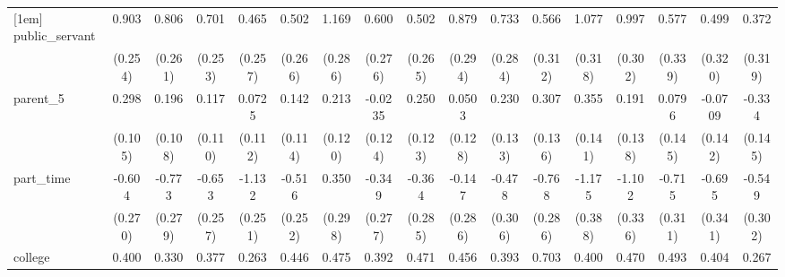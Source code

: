 {\begin{tabular}{l*{16}{c}}
[1em]
public\_servant      &       0.903\sym{***}&       0.806\sym{**} &       0.701\sym{**} &       0.465         &       0.502         &       1.169\sym{***}&       0.600\sym{*}  &       0.502         &       0.879\sym{**} &       0.733\sym{**} &       0.566         &       1.077\sym{***}&       0.997\sym{***}&       0.577         &       0.499         &       0.372         \\
                    &     (0.254)         &     (0.261)         &     (0.253)         &     (0.257)         &     (0.266)         &     (0.286)         &     (0.276)         &     (0.265)         &     (0.294)         &     (0.284)         &     (0.312)         &     (0.318)         &     (0.302)         &     (0.339)         &     (0.320)         &     (0.319)         \\
[1em]
parent\_5            &       0.298\sym{**} &       0.196         &       0.117         &      0.0725         &       0.142         &       0.213         &     -0.0235         &       0.250\sym{*}  &      0.0503         &       0.230         &       0.307\sym{*}  &       0.355\sym{*}  &       0.191         &      0.0796         &     -0.0709         &      -0.334\sym{*}  \\
                    &     (0.105)         &     (0.108)         &     (0.110)         &     (0.112)         &     (0.114)         &     (0.120)         &     (0.124)         &     (0.123)         &     (0.128)         &     (0.133)         &     (0.136)         &     (0.141)         &     (0.138)         &     (0.145)         &     (0.142)         &     (0.145)         \\
[1em]
part\_time           &      -0.604\sym{*}  &      -0.773\sym{**} &      -0.653\sym{*}  &      -1.132\sym{***}&      -0.516\sym{*}  &       0.350         &      -0.349         &      -0.364         &      -0.147         &      -0.478         &      -0.768\sym{**} &      -1.175\sym{**} &      -1.102\sym{**} &      -0.715\sym{*}  &      -0.695\sym{*}  &      -0.549         \\
                    &     (0.270)         &     (0.279)         &     (0.257)         &     (0.251)         &     (0.252)         &     (0.298)         &     (0.277)         &     (0.285)         &     (0.286)         &     (0.306)         &     (0.286)         &     (0.388)         &     (0.336)         &     (0.311)         &     (0.341)         &     (0.302)         \\
[1em]
college             &       0.400\sym{**} &       0.330\sym{*}  &       0.377\sym{**} &       0.263         &       0.446\sym{**} &       0.475\sym{**} &       0.392\sym{**} &       0.471\sym{**} &       0.456\sym{**} &       0.393\sym{*}  &       0.703\sym{***}&       0.400\sym{*}  &       0.470\sym{**} &       0.493\sym{**} &       0.404\sym{*}  &       0.267         \\

\end{tabular}}
